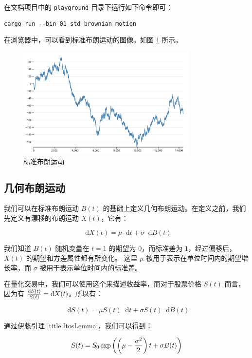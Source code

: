 \documentclass[utf8,a4paper,nofonts,9pt]{ctexbook}
\def\dif{\mathop{}\!\mathrm{d}}
\begin{document}
在文档项目中的 \verb|playground| 目录下运行如下命令即可：

\begin{lstlisting}
cargo run --bin 01_std_brownian_motion
\end{lstlisting}

在浏览器中，可以看到标准布朗运动的图像。如图 \ref{fig:stdBrownianMotion} 所示。

\begin{figure}[h]
    \centering
    \includegraphics[width=0.8\textwidth]{src/static/00_std_brownian_motion.png}
    \caption{标准布朗运动}
    \label{fig:stdBrownianMotion}
\end{figure}

\subsection[几何布朗运动]{几何布朗运动\protect\footnotemark}

我们可以在标准布朗运动 $B(t)$ 的基础上定义几何布朗运动。在定义之前，我们先定义有漂移的布朗运动 $X(t)$，它有：

$$
\dif{X(t)} = \mu \dif{t} + \sigma \dif{B(t)}
$$

我们知道 $B(t)$ 随机变量在 $t = 1$ 的期望为 $0$，而标准差为 $1$，经过偏移后，$X(t)$ 的期望和方差属性都有所变化。
这里 $\mu$ 被用于表示在单位时间内的期望增长率，而 $\sigma$ 被用于表示单位时间内的标准差。

在量化交易中，我们可以使用这个来描述收益率，而对于股票价格 $S(t)$ 而言，因为有 ${\dif{S(t)} \over S(t)} = \dif{X(t)}$。所以有：

$$
\dif{S(t)} = \mu S(t) \dif{t} + \sigma S(t) \dif{B(t)}
$$

通过伊藤引理 \ref{title:ItosLemma}，我们可以得到：

$$
S(t) = S_0 \exp\left(\left(\mu - {\sigma^2 \over 2}\right)t + \sigma B(t)\right)
$$
\end{document}
